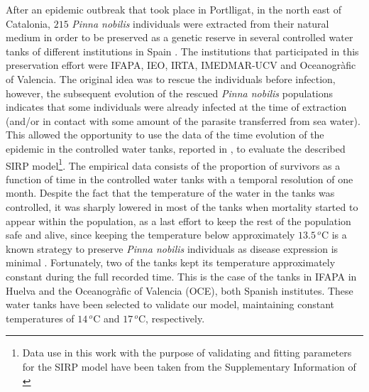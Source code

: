 After an epidemic outbreak that took place in Portlligat, in the north east
of Catalonia, $215$ \textit{Pinna nobilis} individuals were extracted from
their natural medium in order to be preserved as a genetic reserve in several
controlled water tanks of different institutions in Spain \cite{March}. The
institutions that participated in this preservation effort were IFAPA, IEO,
IRTA, IMEDMAR-UCV and Oceanogr\`afic of Valencia. The original idea was to
rescue the individuals before infection, however, the subsequent evolution of
the rescued \textit{Pinna nobilis} populations indicates that some individuals
were already infected at the time of extraction (and/or in contact with some
amount of the parasite transferred from sea water).
This allowed the opportunity to use the data of the time evolution of the
epidemic in the controlled water tanks, reported in \cite{March}, to evaluate
the described SIRP model\footnote{Data use in this work with the purpose of
    validating and fitting parameters for the SIRP model have been taken from
    the
    Supplementary Information of \cite{March}}. The empirical data consists of
the
proportion of survivors as a function of time in the controlled water tanks
with a temporal resolution of one month. Despite the fact that the temperature
of the water in the tanks was controlled, it was sharply lowered in most of the
tanks when mortality started to appear within the population, as a last effort
to keep the rest of the population safe and alive, since keeping the
temperature below  approximately $13.5\, {}^o$C is a known strategy to preserve
\textit{Pinna nobilis} individuals as disease expression is minimal
\cite{Cabanellas2019}. Fortunately, two of the tanks kept its temperature
approximately constant during the full recorded time. This is the case of the
tanks in IFAPA in Huelva and the Oceanogr\`afic of Valencia (OCE), both Spanish
institutes. These water tanks have been selected to validate our model,
maintaining constant temperatures of $14\, {}^o$C and $17\, {}^o$C,
respectively.

